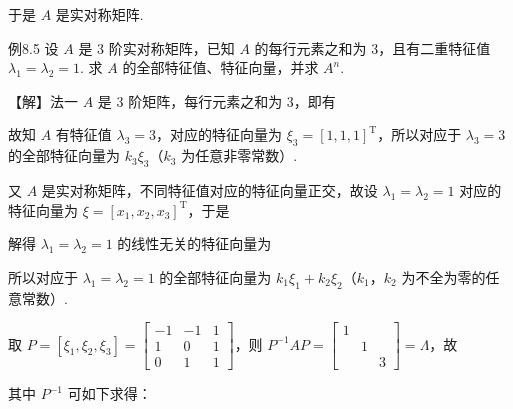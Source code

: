 于是 $A$ 是实对称矩阵.

\begin{fcard}{例8.5}
设 $A$ 是 3 阶实对称矩阵，已知 $A$ 的每行元素之和为 3，且有二重特征值 $\lambda_1=\lambda_2=1$. 求 $A$ 的全部特征值、特征向量，并求 $A^n$.

【解】法一 $A$ 是 3 阶矩阵，每行元素之和为 3，即有


故知 $A$ 有特征值 $\lambda_3=3$，对应的特征向量为 $\xi_3=[1,1,1]^{\mathrm{T}}$，所以对应于 $\lambda_3=3$ 的全部特征向量为 $k_3\xi_3$（$k_3$ 为任意非零常数）.

又 $A$ 是实对称矩阵，不同特征值对应的特征向量正交，故设 $\lambda_1=\lambda_2=1$ 对应的特征向量为 $\xi=[x_1,x_2,x_3]^{\mathrm{T}}$，于是


解得 $\lambda_1=\lambda_2=1$ 的线性无关的特征向量为


所以对应于 $\lambda_1=\lambda_2=1$ 的全部特征向量为 $k_1\xi_1+k_2\xi_2$（$k_1$，$k_2$ 为不全为零的任意常数）.

取 $P=[\xi_1,\xi_2,\xi_3]=\begin{bmatrix}-1&-1&1\\1&0&1\\0&1&1\end{bmatrix}$，则 $P^{-1}AP=\begin{bmatrix}1&&\\&1&\\&&3\end{bmatrix}=\Lambda$，故


其中 $P^{-1}$ 可如下求得：



\end{fcard}
